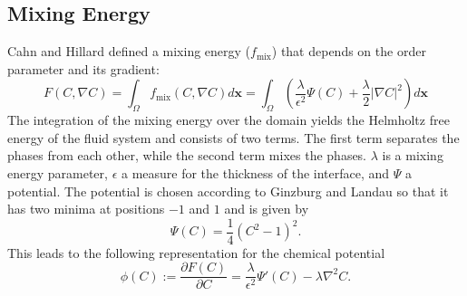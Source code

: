 \subsection{Mixing Energy}
Cahn and Hillard defined a mixing energy ($f_{\text{mix}}$) that depends on the order parameter and its gradient:
\begin{equation}
    F(C, \nabla C) = \int_{\Omega} f_{\mathrm{mix}} (C, \nabla C) d\textbf{x} = \int_{\Omega}\left(\frac{\lambda}{\epsilon^2}\Psi(C)+\frac{\lambda}{2}\vert\nabla C\vert^2\right)d\textbf{x}
\end{equation}
The integration of the mixing energy over the domain yields the Helmholtz free energy of the fluid system and consists of two terms. The first term separates the phases from each other, while the second term mixes the phases. $\lambda$ is a mixing energy parameter, $\epsilon$ a measure for the thickness of the interface, and $\Psi$ a potential. The potential is chosen according to Ginzburg and Landau so that it has two minima at positions $-1$ and $1$ and is given by 
\begin{equation}
    \Psi(C)= \frac{1}{4}\left(C^2-1\right)^2.
\end{equation}
This leads to the following representation for the chemical potential 
\begin{equation}
    \label{eq: chempotentialMIXING_pahseFieldMethod}
    \phi(C):= \frac{\partial F(C)}{\partial C} = \frac{\lambda}{\epsilon^2}\Psi'(C)-\lambda\nabla^2C.
\end{equation}

